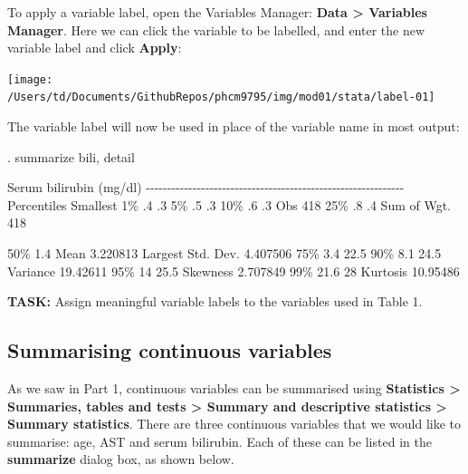 \documentclass[
]{memoir}
\newenvironment{Shaded}{\begin{snugshade}}{\end{snugshade}}
\newcommand{\NormalTok}[1]{#1}
\begin{document}
To apply a variable label, open the Variables Manager: \textbf{Data \textgreater{} Variables Manager}. Here we can click the variable to be labelled, and enter the new variable label and click \textbf{Apply}:

\texttt{[image: /Users/td/Documents/GithubRepos/phcm9795/img/mod01/stata/label-01]}

The variable label will now be used in place of the variable name in most output:

\begin{Shaded}
\begin{Highlighting}[]
\NormalTok{. summarize bili, detail}

\NormalTok{                   Serum bilirubin (mg/dl)}
\NormalTok{{-}{-}{-}{-}{-}{-}{-}{-}{-}{-}{-}{-}{-}{-}{-}{-}{-}{-}{-}{-}{-}{-}{-}{-}{-}{-}{-}{-}{-}{-}{-}{-}{-}{-}{-}{-}{-}{-}{-}{-}{-}{-}{-}{-}{-}{-}{-}{-}{-}{-}{-}{-}{-}{-}{-}{-}{-}{-}{-}{-}{-}}
\NormalTok{      Percentiles      Smallest}
\NormalTok{ 1\%           .4             .3}
\NormalTok{ 5\%           .5             .3}
\NormalTok{10\%           .6             .3       Obs                 418}
\NormalTok{25\%           .8             .4       Sum of Wgt.         418}

\NormalTok{50\%          1.4                      Mean           3.220813}
\NormalTok{                        Largest       Std. Dev.      4.407506}
\NormalTok{75\%          3.4           22.5}
\NormalTok{90\%          8.1           24.5       Variance       19.42611}
\NormalTok{95\%           14           25.5       Skewness       2.707849}
\NormalTok{99\%         21.6             28       Kurtosis       10.95486}
\end{Highlighting}
\end{Shaded}

\textbf{TASK:} Assign meaningful variable labels to the variables used in Table 1.

\hypertarget{summarising-continuous-variables}{%
\subsection{Summarising continuous variables}\label{summarising-continuous-variables}}

As we saw in Part 1, continuous variables can be summarised using \textbf{Statistics \textgreater{} Summaries, tables and tests \textgreater{} Summary and descriptive statistics \textgreater{} Summary statistics}. There are three continuous variables that we would like to summarise: age, AST and serum bilirubin. Each of these can be listed in the \textbf{summarize} dialog box, as shown below.
\end{document}
